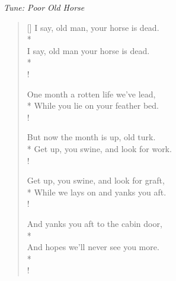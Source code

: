 \documentclass[MAIN]{subfiles}
\begin{document}
\begin{center}
\emph{Tune: Poor Old Horse}
\end{center}

\bigskip

\settowidth{\versewidth}{I say, old man, your horse is dead.}
\begin{verse}[\versewidth]
I say, old man, your horse is dead.\\*
\\
I say, old man your horse is dead.\\*
\\!

One month a rotten life we've lead,\\*
While you lie on your feather bed.\\!

But now the month is up, old turk.\\*
Get up, you swine, and look for work.\\!

Get up, you swine, and look for graft,\\*
While we lays on and yanks you aft.\\!

And yanks you aft to the cabin door,\\*
\\
And hopes we'll never see you more.\\*
\\!

\end{verse}
\end{document}

